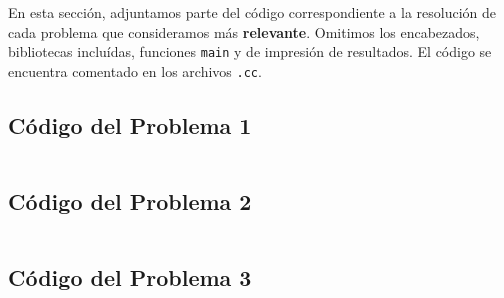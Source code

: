 \documentclass[a4paper]{article}
\begin{document}
En esta sección, adjuntamos parte del código correspondiente a la resolución de cada problema
que consideramos más \textbf{relevante}. Omitimos los encabezados, bibliotecas incluídas,
funciones \verb|main| y de impresión de resultados. El código se encuentra comentado en los
archivos \verb|.cc|.

\subsection{Código del Problema 1}


\begin{lstlisting}
\end{lstlisting}

\vspace*{0.5cm}


\newpage


\subsection{Código del Problema 2}


\begin{lstlisting}
\end{lstlisting}

\vspace*{0.5cm}


\newpage


\subsection{Código del Problema 3}


\begin{lstlisting}
\end{lstlisting}

\vspace*{0.5cm}
\end{document}
